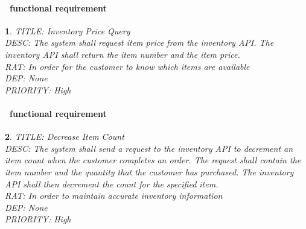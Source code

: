 \documentclass{scrreprt}
\theoremstyle{funreq}
\newtheorem{funreq}{}
\newcommand*{\reqref}[1]{\hyperref[#1]{FR\ref*{#1}}}
\begin{document}
	\paragraph[]{\Subsectionname ~functional requirement }
	\begin{funreq}
		\label{inventory_price}
		TITLE: Inventory Price Query\\
		DESC: The system shall request item price from the inventory API.  The inventory API shall return the item number and the item price.\\
		RAT: In order for the customer to know which items are available\\
		DEP: None\\
		PRIORITY: High\\
	\end{funreq}


	\paragraph[]{\Subsectionname ~functional requirement }
	\begin{funreq}
		\label{inventory_decrement}
		TITLE: Decrease Item Count\\
		DESC: The system shall send a request to the inventory API to decrement an item count when the customer completes an order.  The request shall contain the item number and the quantity that the customer has purchased.  The inventory API shall then decrement the count for the specified item.\\
		RAT: In order to maintain accurate inventory information\\
		DEP: None\\
		PRIORITY: High\\
	\end{funreq}

	
\end{document}
